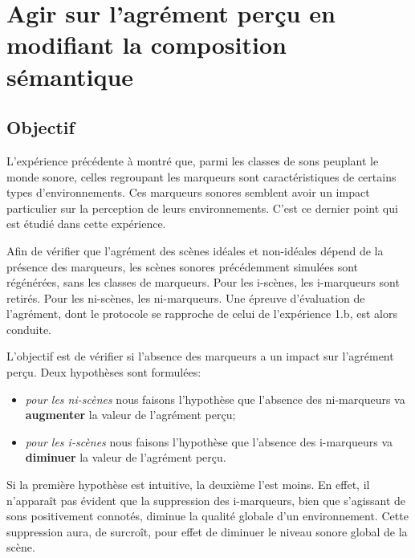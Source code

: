 
\section[Modification de la composition sémantique]{Agir sur l'agrément perçu en modifiant la composition sémantique}
\label{sec:xp3}

\subsection{Objectif}

L'expérience précédente à montré que, parmi les classes de sons peuplant le monde sonore, celles regroupant les marqueurs sont caractéristiques de certains types d'environnements. Ces marqueurs sonores semblent avoir un impact particulier sur la perception de leurs environnements. C'est ce dernier point qui est étudié dans cette expérience.

Afin de vérifier que l'agrément des scènes idéales et non-idéales dépend de la présence des marqueurs, les scènes sonores précédemment simulées sont régénérées, sans les classes de marqueurs. Pour les i-scènes, les i-marqueurs sont retirés. Pour les ni-scènes, les ni-marqueurs. Une épreuve d'évaluation de l'agrément, dont le protocole se rapproche de celui de l'expérience 1.b, est alors conduite.

L'objectif est de vérifier si l'absence des marqueurs a un impact sur l'agrément perçu. Deux hypothèses sont formulées:

\begin{itemize}
\item \emph{pour les ni-scènes} nous faisons l'hypothèse que l'absence des ni-marqueurs va \textbf{augmenter} la valeur de l'agrément perçu;
\item \emph{pour les i-scènes} nous faisons l'hypothèse que l'absence des i-marqueurs va \textbf{diminuer} la valeur de l'agrément perçu.
\end{itemize}

Si la première hypothèse est intuitive, la deuxième l'est moins. En effet, il n’apparaît pas évident que la suppression des i-marqueurs, bien que s'agissant de sons positivement connotés, diminue la qualité globale d'un environnement. Cette suppression aura, de surcroît, pour effet de diminuer le niveau sonore global de la scène. 

